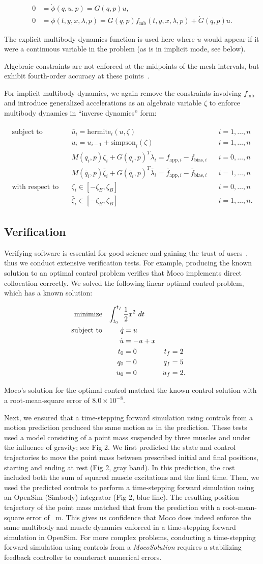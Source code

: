 \documentclass[10pt,letterpaper]{article}
\newcommand{\hermitesimpsonkincon}{
    \begin{align}
         0 &= \dot{\phi}(q, u, p) = G(q, p) u,\\
         0 &= \ddot{\phi}(t, y, x, \lambda, p) = G(q, p) f_{\textrm{mb}}(t, y, x, \lambda, p) + \dot{G}(q, p) u.
    \end{align}
}
\newcommand{\hermitesimpsonimplicit}{
\begin{align}
    \begin{aligned}
    \mbox{subject to} \quad
         & \bar{u}_i = \textrm{hermite}_i(u, \zeta) && i = 1, \ldots, n \\
         & u_i = u_{i-1} + \textrm{simpson}_i(\zeta)  && i = 1, \ldots, n \\
         & M(q_i, p)\zeta_i + G(q_i, p)^T \lambda_i =
          f_{\textrm{app},i} -
            f_{\textrm{bias},i} && i = 0, \ldots, n \\
         & M(\bar{q}_i, p)\bar{\zeta}_i + G(\bar{q}_i, p)^T \bar{\lambda}_i =
          \bar{f}_{\textrm{app},i} -
            \bar{f}_{\textrm{bias},i} && i = 1, \ldots, n \\
    \mbox{with respect to} \quad
         & \zeta_i \in [-\zeta_{B}, \zeta_{B}] && i = 0, \ldots, n \\
         & \bar{\zeta}_i \in [-\zeta_{B}, \zeta_{B}] && i = 1, \ldots, n.
    \end{aligned}
\end{align}
}
\newcommand{\analytic}{
\begin{equation}
    \begin{aligned}
        \mbox{minimize} \quad
         \mathrlap{\int_{t_0}^{t_f} \frac{1}{2}x^2~dt}  \\
         \mbox{subject to} \quad
         && \dot{q} &= u \\
         && \dot{u} &= -u + x \\
         && t_0 &= 0 & t_f &= 2 \\
         && q_0 &= 0 & q_f &= 5 \\
         && u_0 &= 0 & u_f &= 2.
    \end{aligned}
\end{equation}
}
\begin{document}
\hermitesimpsonkincon

The explicit multibody dynamics function is used here where $ \dot{u} $ would appear if it were a continuous variable in the problem (as is in implicit mode, see below).

Algebraic constraints are not enforced at the midpoints of the mesh intervals, but exhibit fourth-order accuracy at these points~\cite{Posa:2016}.

For implicit multibody dynamics, we again remove the constraints involving $f_\mathrm{mb}$ and introduce generalized accelerations as an algebraic variable $\zeta$ to enforce multibody dynamics in “inverse dynamics” form:

\hermitesimpsonimplicit

\subsection*{Verification}

Verifying software is essential for good science and gaining the trust of users~\cite{Hicks:2015bo}, thus we conduct extensive verification tests. For example, producing the known solution to an optimal control problem verifies that Moco implements direct collocation correctly. We solved the following linear optimal control problem, which has a known solution:

\analytic

Moco’s solution for the optimal control matched the known control solution with a root-mean-square error of $8.0 \times 10^{-8}$.

Next, we ensured that a time-stepping forward simulation using controls from a motion prediction produced the same motion as in the prediction. These tests used a model consisting of a point mass suspended by three muscles and under the influence of gravity; see Fig 2. We first predicted the state and control trajectories to move the point mass between prescribed initial and final positions, starting and ending at rest (Fig 2, gray band). In this prediction, the cost included both the sum of squared muscle excitations and the final time. Then, we used the predicted controls to perform a time-stepping forward simulation using an OpenSim (Simbody) integrator (Fig 2, blue line). The resulting position trajectory of the point mass matched that from the prediction with a root-mean-square error of \unskip~m. This gives us confidence that Moco does indeed enforce the same multibody and muscle dynamics enforced in a time-stepping forward simulation in OpenSim. For more complex problems, conducting a time-stepping forward simulation using controls from a \textit{MocoSolution} requires a stabilizing feedback controller to counteract numerical errors.
\end{document}

